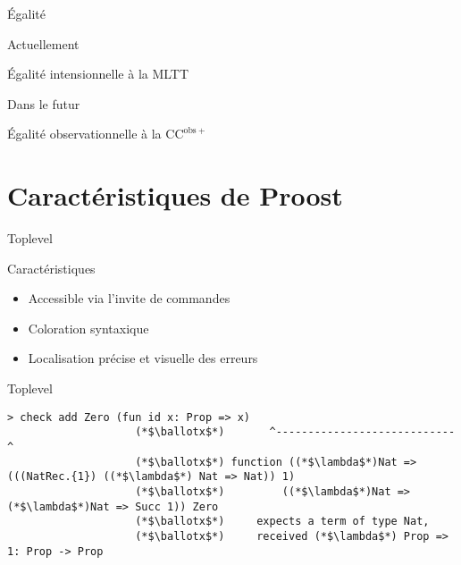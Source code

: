 \documentclass[12pt, aspectratio=169]{beamer}
\begin{document}
        \begin{frame}{Égalité}
            
            \begin{block}{Actuellement}
                
                Égalité intensionnelle à la MLTT

            \end{block}

            \vfill
            \pause

            \begin{alertblock}{Dans le futur}
                
                Égalité observationnelle à la $\mathrm{CC}^{\mathrm{obs}+}$

            \end{alertblock}

        \end{frame}

    \section{Caractéristiques de Proost}

        \begin{frame}[fragile]{Toplevel}
            
            \begin{block}{Caractéristiques}
                
                \begin{itemize}
                    \item Accessible via l'invite de commandes \pause
                    \item Coloration syntaxique \pause
                    \item Localisation précise et visuelle des erreurs
                \end{itemize}

            \end{block} \pause

            \begin{block}{Toplevel}
                
                \begin{lstlisting}[language=mdln]
                    > check add Zero (fun id x: Prop => x)
                    (*$\ballotx$*)       ^----------------------------^
                    (*$\ballotx$*) function ((*$\lambda$*)Nat => (((NatRec.{1}) ((*$\lambda$*) Nat => Nat)) 1)
                    (*$\ballotx$*)         ((*$\lambda$*)Nat => (*$\lambda$*)Nat => Succ 1)) Zero
                    (*$\ballotx$*)     expects a term of type Nat,
                    (*$\ballotx$*)     received (*$\lambda$*) Prop => 1: Prop -> Prop
                \end{lstlisting}

            \end{block}

        \end{frame}
\end{document}
